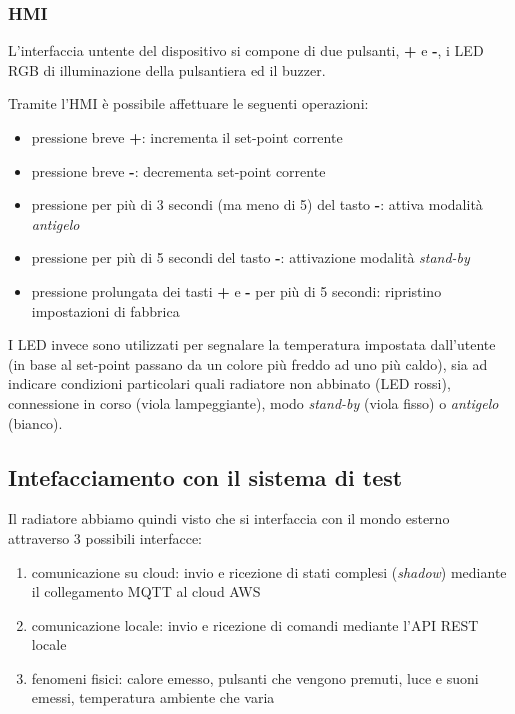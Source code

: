\documentclass[a4paper,titlepage]{article}
\begin{document}
\subsubsection{HMI}

L'interfaccia untente del dispositivo si compone di due pulsanti, \textbf{+} e \textbf{-},
i LED RGB di illuminazione della pulsantiera ed il buzzer.

Tramite l'HMI è possibile affettuare le seguenti operazioni:

\begin{itemize}
    \item pressione breve \textbf{+}: incrementa il set-point corrente
    \item pressione breve \textbf{-}: decrementa set-point corrente
    \item pressione per più di 3 secondi (ma meno di 5) del tasto \textbf{-}:
        attiva modalità \textit{antigelo}
    \item pressione per più di 5 secondi del tasto \textbf{-}: attivazione modalità
        \textit{stand-by}
    \item pressione prolungata dei tasti \textbf{+} e \textbf{-} per più di 5 secondi:
        ripristino impostazioni di fabbrica
\end{itemize}

I LED invece sono utilizzati per segnalare la temperatura impostata dall'utente
(in base al set-point passano da un colore più freddo ad uno più caldo), sia ad
indicare condizioni particolari quali radiatore non abbinato (LED rossi), connessione
in corso (viola lampeggiante), modo \textit{stand-by} (viola fisso) o \textit{antigelo} (bianco).

\subsection{Intefacciamento con il sistema di test}

Il radiatore abbiamo quindi visto che si interfaccia con il mondo esterno attraverso
3 possibili interfacce:

\begin{enumerate}
    \item comunicazione su cloud: invio e ricezione di stati complesi (\textit{shadow})
        mediante il collegamento MQTT al cloud AWS
    \item comunicazione locale: invio e ricezione di comandi mediante l'API REST locale
    \item fenomeni fisici: calore emesso, pulsanti che vengono premuti, luce e suoni
        emessi, temperatura ambiente che varia
\end{enumerate}
\end{document}
